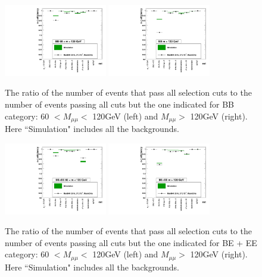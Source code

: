 \begin{figure}[htbp]
\centering
\includegraphics[width=0.4\textwidth]{Images/Cap5/60m120BB.pdf}
\includegraphics[width=0.4\textwidth]{Images/Cap5/120mBB.pdf}
\caption{The ratio of the number of events that pass all selection cuts to the number of events passing all cuts but the one indicated for BB category: 60 $< M_{\mu\mu} <$ 120GeV (left) and $M_{\mu\mu} >$ 120GeV (right). Here ``Simulation" includes all the backgrounds.}
\label{Nminum1_BB}
\end{figure}

\begin{figure}[htbp]
\centering
\includegraphics[width=0.4\textwidth]{Images/Cap5/60m120BE.pdf}
\includegraphics[width=0.4\textwidth]{Images/Cap5/120mBE.pdf}
\caption{The ratio of the number of events that pass all selection cuts to the number of events passing all cuts but the one indicated for BE + EE category: 60 $< M_{\mu\mu} <$ 120GeV (left) and $M_{\mu\mu} >$ 120GeV (right). Here ``Simulation" includes all the backgrounds.}
\label{Nminum1_BEEE}
\end{figure}

